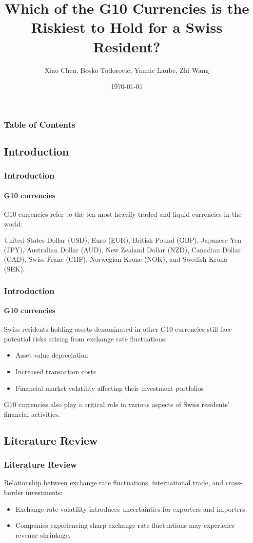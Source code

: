 \documentclass[10pt]{beamer}
\author{Xiao Chen, Bosko Todorovic, Yannic Laube, Zhi Wang}
\title{Which of the G10 Currencies is the Riskiest to Hold for a Swiss Resident?}
\institute{University of Zurich}
\date{\today}
\begin{document}
\begin{frame}
\titlepage
\end{frame}
\begin{frame}
\frametitle{Table of Contents}
\tableofcontents
\end{frame}
\begin{frame}
\section{Introduction}
\frametitle{Introduction}
\framesubtitle{G10 currencies}
G10 currencies refer to the ten most heavily traded and liquid currencies in the world: 

United States Dollar (USD), Euro (EUR), British Pound (GBP), Japanese Yen (JPY), Australian Dollar (AUD), New Zealand Dollar (NZD), Canadian Dollar (CAD), Swiss Franc (CHF), Norwegian Krone (NOK), and Swedish Krona (SEK).

\end{frame}
\begin{frame}
\frametitle{Introduction}
\framesubtitle{G10 currencies}
Swiss residents holding assets denominated in other G10
currencies still face potential risks arising from exchange rate fluctuations:
\begin{itemize}
    \item Asset value depreciation
    \item Increased transaction costs
    \item Financial market volatility affecting their investment portfolios
\end{itemize}

G10 currencies also play a critical role in various aspects of Swiss residents’ financial activities.
\end{frame}
\begin{frame}
\section{Literature Review}
\frametitle{Literature Review}
Relationship between exchange rate fluctuations, international trade, and cross-border investments:~\cite{AUBOIN_RUTA_2013}
\begin{itemize}
    \item Exchange rate volatility introduces uncertainties for exporters and importers.
    \item Companies experiencing sharp exchange rate fluctuations may experience revenue shrinkage.
\end{itemize}
\end{frame}
\end{document}
